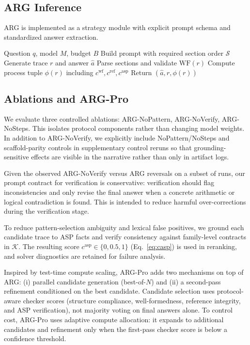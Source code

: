 \documentclass{article}
\begin{document}
\subsection{ARG Inference}
ARG is implemented as a strategy module with explicit prompt schema and standardized answer extraction.

\begin{algorithm}[t]
\caption{ARG Inference (single instance)}
\label{alg:arg}
\begin{algorithmic}[1]
\REQUIRE Question \(q\), model \(M\), budget \(B\)
\STATE Build prompt with required section order \(\mathcal{S}\)
\STATE Generate trace \(r\) and answer \(\hat a\)
\STATE Parse sections and validate \(\mathrm{WF}(r)\)
\STATE Compute process tuple \(\phi(r)\) including \(c^{\text{wf}},c^{\text{ref}},c^{\text{asp}}\)
\STATE Return \((\hat a, r, \phi(r))\)
\end{algorithmic}
\end{algorithm}

\subsection{Ablations and ARG-Pro}
We evaluate three controlled ablations: ARG-NoPattern, ARG-NoVerify, ARG-NoSteps. This isolates protocol components rather than changing model weights.
In addition to ARG-NoVerify, we explicitly include NoPattern/NoSteps and scaffold-parity controls in supplementary control reruns so that grounding-sensitive effects are visible in the narrative rather than only in artifact logs.

Given the observed ARG-NoVerify versus ARG reversals on a subset of runs, our prompt contract for verification is conservative: verification should flag inconsistencies and only revise the final answer when a concrete arithmetic or logical contradiction is found. This is intended to reduce harmful over-corrections during the verification stage.

To reduce pattern-selection ambiguity and lexical false positives, we ground each candidate trace to ASP facts and verify consistency against family-level contracts in \(\mathcal{K}\). The resulting score \(c^{\text{asp}}\in\{0,0.5,1\}\) (Eq.~\eqref{eq:casp}) is used in reranking, and solver diagnostics are retained for failure analysis.

Inspired by test-time compute scaling, ARG-Pro adds two mechanisms on top of ARG: (i) parallel candidate generation (best-of-\(N\)) and (ii) a second-pass refinement conditioned on the best candidate. Candidate selection uses protocol-aware checker scores (structure compliance, well-formedness, reference integrity, and ASP verification), not majority voting on final answers alone.
To control cost, ARG-Pro uses adaptive compute allocation: it expands to additional candidates and refinement only when the first-pass checker score is below a confidence threshold.
\end{document}
